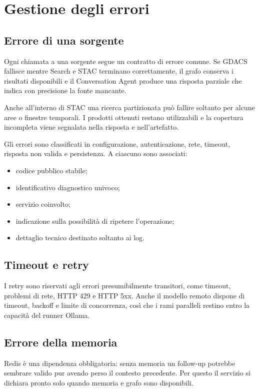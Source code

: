 \section{Gestione degli errori}

\subsection{Errore di una sorgente}

Ogni chiamata a una sorgente segue un contratto di errore comune. Se GDACS
fallisce mentre Search e STAC terminano correttamente, il grafo conserva i
risultati disponibili e il Conversation Agent produce una risposta parziale
che indica con precisione la fonte mancante.

Anche all'interno di STAC una ricerca partizionata può fallire soltanto per
alcune aree o finestre temporali. I prodotti ottenuti restano utilizzabili e
la copertura incompleta viene segnalata nella risposta e nell'artefatto.

Gli errori sono classificati in configurazione, autenticazione, rete, timeout,
risposta non valida e persistenza. A ciascuno sono associati:

\begin{itemize}
    \item codice pubblico stabile;
    \item identificativo diagnostico univoco;
    \item servizio coinvolto;
    \item indicazione sulla possibilità di ripetere l'operazione;
    \item dettaglio tecnico destinato soltanto ai log.
\end{itemize}

\subsection{Timeout e retry}

I retry sono riservati agli errori presumibilmente transitori, come timeout,
problemi di rete, HTTP 429 e HTTP 5xx. Anche il modello remoto dispone di
timeout, backoff e limite di concorrenza, così che i rami paralleli restino
entro la capacità del runner Ollama.

\subsection{Errore della memoria}

Redis è una dipendenza obbligatoria: senza memoria un follow-up potrebbe
sembrare valido pur avendo perso il contesto precedente. Per questo il
servizio si dichiara pronto solo quando memoria e grafo sono disponibili.

